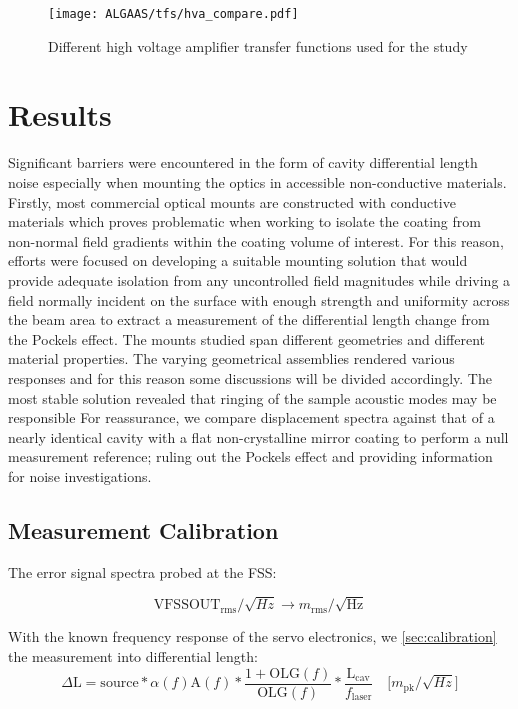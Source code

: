 \begin{figure}[H]
    \texttt{[image: ALGAAS/tfs/hva\_compare.pdf]}
    \caption{Different high voltage amplifier transfer functions used for the study}
    \label{fig:hvacompare}
\end{figure}

\section{Results}
Significant barriers were encountered in the form of cavity differential length noise especially when mounting the optics in accessible non-conductive materials. Firstly, most commercial optical mounts are constructed with conductive materials which proves problematic when working to isolate the coating from non-normal field gradients within the coating volume of interest. For this reason, efforts were focused on developing a suitable mounting solution that would provide adequate isolation from any uncontrolled field magnitudes while driving a field normally incident on the surface with enough strength and uniformity across the beam area to extract a measurement of the differential length change from the Pockels effect. The mounts studied span different geometries and different material properties. The varying geometrical assemblies rendered various responses and for this reason some discussions will be divided accordingly. The most stable solution revealed that ringing of the sample acoustic modes may be responsible For reassurance, we compare displacement spectra against that of a nearly identical cavity with a flat non-crystalline mirror coating to perform a null measurement reference; ruling out the Pockels effect and providing information for noise investigations.

\subsection{Measurement Calibration}
The error signal spectra probed at the FSS:

\begin{equation}
\mathrm{VFSSOUT}_\mathrm{rms}/\sqrt{Hz} \rightarrow m_\mathrm{rms}/\sqrt{\mathrm{Hz}}
\end{equation}

With the known frequency response of the servo electronics, we \autoref{sec:calibration} the measurement into differential length:
\begin{equation}
	\Delta \mathrm{L} = \mathrm{source}*\alpha(f) \mathrm{A}(f)*\frac{1+\mathrm{OLG}(f)}{\mathrm{OLG}(f)}*\frac{\mathrm{L_{cav}}}{f_\mathrm{laser}} \quad \big[ m_\mathrm{pk} / \sqrt{Hz} \big]
\end{equation}

